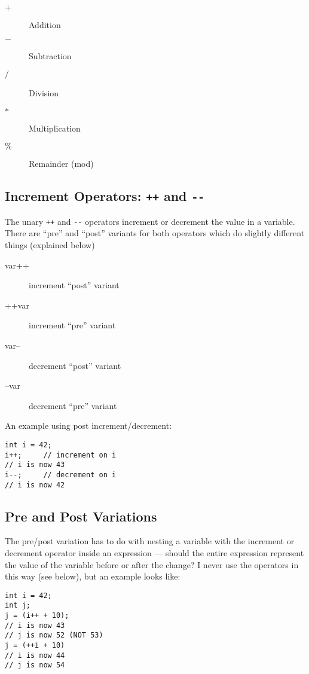 \begin{description}
\item[$+$] Addition
\item[$-$] Subtraction
\item[$/$] Division
\item[$*$] Multiplication
\item[$\%$] Remainder (mod)
\end{description}

\subsection{Increment Operators: \lstinline{++} and \lstinline{--}}

The unary \lstinline{++} and \lstinline{--} operators increment or decrement the value in a variable. There are ``pre'' and ``post'' variants for both operators which do slightly different things (explained below)

\begin{description}
\item[var++] increment ``post'' variant
\item[++var] increment ``pre'' variant
\item[var--] decrement ``post'' variant
\item[--var] decrement ``pre'' variant
\end{description}

An example using post increment/decrement:
\begin{lstlisting}
int i = 42;
i++;     // increment on i
// i is now 43
i--;     // decrement on i
// i is now 42
\end{lstlisting}

\subsection{Pre and Post Variations}

The pre/post variation has to do with nesting a variable with the increment or decrement operator inside an expression --- should the entire expression represent the value of the variable before or after the change? I never use the operators in this way (see below), but an example looks like:

\begin{lstlisting}
int i = 42;
int j;
j = (i++ + 10);
// i is now 43
// j is now 52 (NOT 53)
j = (++i + 10)
// i is now 44
// j is now 54
\end{lstlisting}

